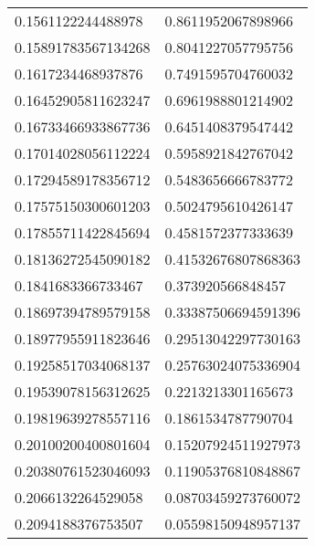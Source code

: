 \begin{supertabular}{ll}
0.1561122244488978  & 0.8611952067898966    \\
0.15891783567134268 & 0.8041227057795756    \\
0.1617234468937876  & 0.7491595704760032    \\
0.16452905811623247 & 0.6961988801214902    \\
0.16733466933867736 & 0.6451408379547442    \\
0.17014028056112224 & 0.5958921842767042    \\
0.17294589178356712 & 0.5483656666783772    \\
0.17575150300601203 & 0.5024795610426147    \\
0.17855711422845694 & 0.4581572377333639    \\
0.18136272545090182 & 0.41532676807868363   \\
0.1841683366733467  & 0.373920566848457     \\
0.18697394789579158 & 0.33387506694591396   \\
0.18977955911823646 & 0.29513042297730163   \\
0.19258517034068137 & 0.25763024075336904   \\
0.19539078156312625 & 0.2213213301165673    \\
0.19819639278557116 & 0.1861534787790704    \\
0.20100200400801604 & 0.15207924511927973   \\
0.20380761523046093 & 0.11905376810848867   \\
0.2066132264529058  & 0.08703459273760072   \\
0.2094188376753507  & 0.05598150948957137   \\
\end{supertabular}
